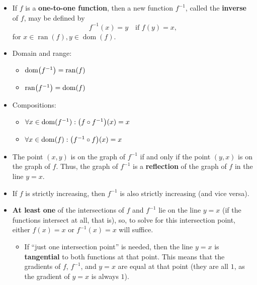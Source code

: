 \documentclass[12pt,a4paper,titlepage]{article}
\DeclareMathOperator{\dom}{dom}
\DeclareMathOperator{\ran}{ran}
\DeclarePairedDelimiter {\pars}  {  (      }     {  )      }
\begin{document}
            \begin{SummaryBox}[title=Inverse functions, sidebyside, left=0pt, right=0pt, righthand ratio=0.45]
                \begin{itemize}
                    \item If $f$ is a \textbf{one-to-one function}, then a new function $f^{-1}$, called the \textbf{inverse} of $f$, may be defined by
                    \[
                        f^{-1}(x) = y\quad \text{if }f(y) = x,
                    \]
                    for $x \in \ran(f), y \in \dom(f)$.
                    \item Domain and range:
                    \begin{itemize}[topsep=0pt]
                        \item $\dom\pars*{f^{-1}} = \ran(f)$
                        \item $\ran\pars*{f^{-1}} = \dom(f)$
                    \end{itemize}
                    \item Compositions:
                    \begin{itemize}[topsep=0pt]
                        \item $\forall x \in \dom(f^{-1}): \pars*{f \circ f^{-1}}(x) = x$
                        \item $\forall x \in \dom(f): \pars*{f^{-1} \circ f}(x) = x$
                    \end{itemize}
                    \item The point $(x,y)$ is on the graph of $f^{-1}$ if and only if the point $(y,x)$ is on the graph of $f$. Thus, the graph of $f^{-1}$ is a \textbf{reflection} of the graph of $f$ in the line $y=x$.
                    \item If $f$ is strictly increasing, then $f^{-1}$ is also strictly increasing (and vice versa).
                    \item \textbf{At least one} of the intersections of $f$ and $f^{-1}$ lie on the line $y=x$ (if the functions intersect at all, that is), so, to solve for this intersection point, either $f(x) = x$ or $f^{-1}(x) = x$ will suffice.
                    \begin{itemize}[topsep=0pt]
                        \item If ``just one intersection point'' is needed, then the line $y=x$ is \textbf{tangential} to both functions at that point. This means that the gradients of $f$, $f^{-1}$, and $y=x$ are equal at that point (they are all $1$, as the gradient of $y=x$ is always $1$).

\end{itemize}
\end{itemize}
\end{SummaryBox}
\end{document}
